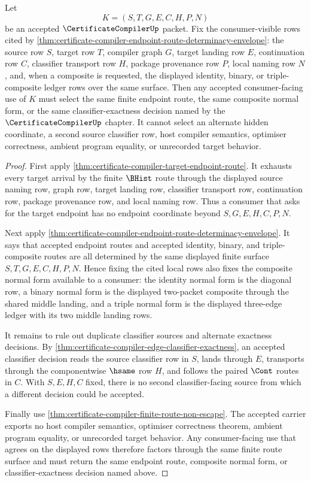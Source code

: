 \begin{corollary}
\label{cor:certificate-compiler-target-endpoint-consumer-determinacy}
Let
$$
K=(S,T,G,E,C,H,P,N)
$$
be an accepted $\CertificateCompilerUp$ packet. Fix the consumer-visible rows cited by \autoref{thm:certificate-compiler-endpoint-route-determinacy-envelope}: the source row $S$, target row $T$, compiler graph $G$, target landing row $E$, continuation row $C$, classifier transport row $H$, package provenance row $P$, local naming row $N$, and, when a composite is requested, the displayed identity, binary, or triple-composite ledger rows over the same surface. Then any accepted consumer-facing use of $K$ must select the same finite endpoint route, the same composite normal form, or the same classifier-exactness decision named by the $\CertificateCompilerUp$ chapter. It cannot select an alternate hidden coordinate, a second source classifier row, host compiler semantics, optimiser correctness, ambient program equality, or unrecorded target behavior.
\end{corollary}
\begin{proof}
First apply \autoref{thm:certificate-compiler-target-endpoint-route}. It exhausts every target arrival by the finite $\BHist$ route through the displayed source naming row, graph row, target landing row, classifier transport row, continuation row, package provenance row, and local naming row. Thus a consumer that asks for the target endpoint has no endpoint coordinate beyond $S,G,E,H,C,P,N$.

Next apply \autoref{thm:certificate-compiler-endpoint-route-determinacy-envelope}. It says that accepted endpoint routes and accepted identity, binary, and triple-composite routes are all determined by the same displayed finite surface $S,T,G,E,C,H,P,N$. Hence fixing the cited local rows also fixes the composite normal form available to a consumer: the identity normal form is the diagonal row, a binary normal form is the displayed two-packet composite through the shared middle landing, and a triple normal form is the displayed three-edge ledger with its two middle landing rows.

It remains to rule out duplicate classifier sources and alternate exactness decisions. By \autoref{thm:certificate-compiler-edge-classifier-exactness}, an accepted classifier decision reads the source classifier row in $S$, lands through $E$, transports through the componentwise $\hsame$ row $H$, and follows the paired $\Cont$ routes in $C$. With $S,E,H,C$ fixed, there is no second classifier-facing source from which a different decision could be accepted.

Finally use \autoref{thm:certificate-compiler-finite-route-non-escape}. The accepted carrier exports no host compiler semantics, optimiser correctness theorem, ambient program equality, or unrecorded target behavior. Any consumer-facing use that agrees on the displayed rows therefore factors through the same finite route surface and must return the same endpoint route, composite normal form, or classifier-exactness decision named above.
\end{proof}
